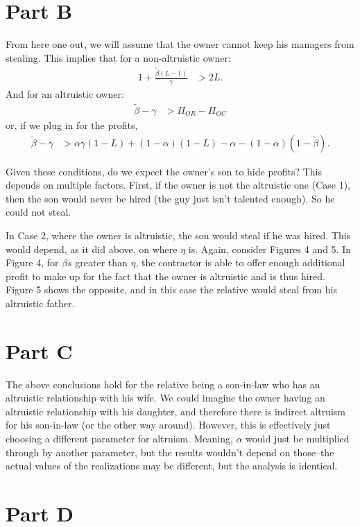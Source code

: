 \documentclass[12pt]{paper}
\begin{document}
\section{Part B}
From here one out, we will assume that the owner cannot keep his managers from stealing. This implies that for a non-altruistic owner:
\begin{align}
1+\frac{\tilde{\beta}(L-1)}{\gamma} &>2L.
\end{align}
And for an altruistic owner:
\begin{align*}
\tilde{\beta}-\gamma&>\Pi_{OR}-\Pi_{OC}
\end{align*}
or, if we plug in for the profits,
\begin{align}
\tilde{\beta}-\gamma&>\alpha \gamma(1-L)+(1-\alpha)(1-L)-\alpha-(1-\alpha)(1-\tilde{\beta}).
\end{align}

Given these conditions, do we expect the owner's son to hide profits? This depends on multiple factors. First, if the owner is not the altruistic one (Case 1), then the son would never be hired (the guy just isn't talented enough). So he could not steal.

In Case 2, where the owner is altruistic, the son would steal if he was hired. This would depend, as it did above, on where $\eta$ is. Again, consider Figures 4 and 5. In Figure 4, for $\beta s$ greater than $\eta$, the contractor is able to offer enough additional profit to make up for the fact that the owner is altruistic and is thus hired. Figure 5 shows the opposite, and in this case the relative would steal from his altruistic father.

\section{Part C}
The above conclusions hold for the relative being a son-in-law who has an altruistic relationship with his wife. We could imagine the owner having an altruistic relationship with his daughter, and therefore there is indirect altruism for his son-in-law (or the other way around). However, this is effectively just choosing a different parameter for altruism. Meaning, $\alpha$ would just be multiplied through by another parameter, but the results wouldn't depend on those--the actual values of the realizations may be different, but the analysis is identical.

\section{Part D}
\end{document}
